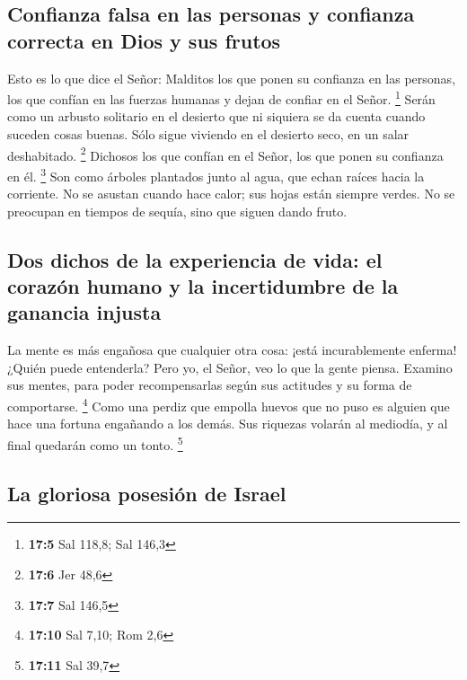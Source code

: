 \hypertarget{confianza-falsa-en-las-personas-y-confianza-correcta-en-dios-y-sus-frutos}{%
\subsection{Confianza falsa en las personas y confianza correcta en Dios
y sus
frutos}\label{confianza-falsa-en-las-personas-y-confianza-correcta-en-dios-y-sus-frutos}}

 Esto es lo que dice el Señor: Malditos los que ponen su
confianza en las personas, los que confían en las fuerzas humanas y
dejan de confiar en el Señor. \footnote{\textbf{17:5} Sal 118,8; Sal
  146,3}  Serán como un arbusto solitario en el desierto
que ni siquiera se da cuenta cuando suceden cosas buenas. Sólo sigue
viviendo en el desierto seco, en un salar deshabitado. \footnote{\textbf{17:6}
  Jer 48,6}  Dichosos los que confían en el Señor, los que
ponen su confianza en él. \footnote{\textbf{17:7} Sal 146,5}
 Son como árboles plantados junto al agua, que echan
raíces hacia la corriente. No se asustan cuando hace calor; sus hojas
están siempre verdes. No se preocupan en tiempos de sequía, sino que
siguen dando fruto.

\hypertarget{dos-dichos-de-la-experiencia-de-vida-el-corazuxf3n-humano-y-la-incertidumbre-de-la-ganancia-injusta}{%
\subsection{Dos dichos de la experiencia de vida: el corazón humano y la
incertidumbre de la ganancia
injusta}\label{dos-dichos-de-la-experiencia-de-vida-el-corazuxf3n-humano-y-la-incertidumbre-de-la-ganancia-injusta}}

 La mente es más engañosa que cualquier otra cosa: ¡está
incurablemente enferma! ¿Quién puede entenderla?  Pero
yo, el Señor, veo lo que la gente piensa. Examino sus mentes, para poder
recompensarlas según sus actitudes y su forma de comportarse.
\footnote{\textbf{17:10} Sal 7,10; Rom 2,6}  Como una
perdiz que empolla huevos que no puso es alguien que hace una fortuna
engañando a los demás. Sus riquezas volarán al mediodía, y al final
quedarán como un tonto. \footnote{\textbf{17:11} Sal 39,7}

\hypertarget{la-gloriosa-posesiuxf3n-de-israel}{%
\subsection{La gloriosa posesión de
Israel}\label{la-gloriosa-posesiuxf3n-de-israel}}


